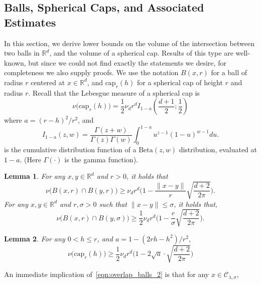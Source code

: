 \documentclass{article}
\newcommand{\Reals}{\mathbb{R}}
\newcommand{\1}{\mathbf{1}}
\newcommand{\Rd}{\Reals^d}
\newcommand{\mc}[1]{\mathcal{#1}}
\newtheorem{lemma}{Lemma}[section]
\theoremstyle{definition}
\theoremstyle{remark}
\begin{document}
\subsection{Balls, Spherical Caps, and Associated Estimates}
\label{subsec:spherical caps}
In this section, we derive lower bounds on the volume of the intersection between two balls in $\Rd$, and the volume of a spherical cap. Results of this type are well-known, but since we could not find exactly the statements we desire, for completeness we also supply proofs. We use the notation $B(x,r)$ for a ball of radius $r$ centered at $x \in \Rd$, and $\mathrm{cap}_{r}(h)$ for a spherical cap of height $r$ and radius $r$. Recall that the Lebesgue measure of a spherical cap is
\begin{equation*}
\nu\bigl(\mathrm{cap}_r(h)\bigr) = \frac{1}{2} \nu_d r^d I_{1 - a}\left(\frac{d + 1}{2}; \frac{1}{2}\right)
\end{equation*}
where $a = (r - h)^2/r^2$, and
\begin{equation*}
I_{1 - a}(z,w) = \frac{\Gamma(z + w)}{\Gamma(z) \Gamma(w)} \int_{0}^{1 - a} u^{z - 1} (1 - u)^{w - 1} du.
\end{equation*}
is the cumulative distribution function of a $\mathrm{Beta}(z,w)$ distribution, evaluated at $1 - a$. (Here $\Gamma(\cdot)$ is the gamma function).
\begin{lemma}
	\label{lem:overlap_balls}
	For any $x,y \in \Rd$ and $r > 0$, it holds that
	\begin{equation}
	\label{eqn:overlap_balls_1}
	\nu\bigl(B(x,r) \cap B(y,r)\bigr) \geq \nu_d r^d\biggl(1 - \frac{\|x - y\|}{r} \sqrt{\frac{d + 2}{2\pi}}\biggr).
	\end{equation}
	For any $x,y \in \Rd$ and $r,\sigma > 0$ such that $\|x - y\| \leq \sigma$, it holds that,
	\begin{equation}
	\label{eqn:overlap_balls_2}
	\nu\bigl(B(x,r) \cap B(y,\sigma)\bigr) \geq \frac{1}{2} \nu_d r^d\biggl(1 - \frac{r}{\sigma}\sqrt{\frac{d + 2}{2\pi}}\biggr).
	\end{equation}
\end{lemma}
\begin{lemma}
	\label{lem:volume_of_spherical_cap}
	For any $0 < h \leq r$, and $a = 1 - (2 r h - h^2)/r^2$,
	\begin{equation*}
	\nu\bigl(\mathrm{cap}_r(h)\bigr) \geq \frac{1}{2}\nu_dr^d\bigl(1 - 2\sqrt{a} \cdot \sqrt{\frac{d + 2}{2\pi}}\bigr)
	\end{equation*}
\end{lemma}
An immediate implication of~\eqref{eqn:overlap_balls_2} is that for any $x \in \mc{C}_{\lambda,\sigma}$,
\end{document}
